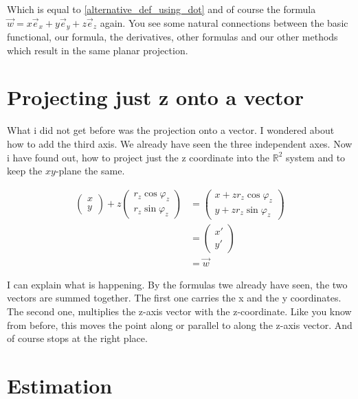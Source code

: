 \documentclass[a4paper]{article}
\begin{document}
Which is equal to \ref{alternative_def_using_dot} and of course the formula $\vec{w} = x\vec{e}_{x}+y\vec{e}_{y}+z\vec{e}_{z}$ again. You see some natural connections between the basic functional, our formula, the derivatives, other formulas and our other methods which result in the same planar projection.\\


\section{Projecting just z onto a vector}


\label{projecting_just_z}
What i did not get before was the projection onto a vector. I wondered about how to add the third axis. We already have seen the three independent axes. Now i have found out, how to project just the z coordinate into the $\mathbb{R}^{2}$ system and to keep the $xy$-plane the same. 

\begin{displaymath}
\begin{align}
\begin{pmatrix}x\\y\end{pmatrix} + z\begin{pmatrix}r_z\cos\varphi_z\\r_z\sin\varphi_z\end{pmatrix} &= \begin{pmatrix}x+zr_{z}\cos\varphi_z\\y+zr_{z}\sin\varphi_z\end{pmatrix}\\ &= \begin{pmatrix}x'\\y'\end{pmatrix}\\ &= \vec{w}
\end{align}
\end{displaymath}

I can explain what is happening. By the formulas twe already have seen, the two vectors are summed together. The first one carries the x and the y coordinates. The second one, multiplies the z-axis vector with the z-coordinate. Like you know from before, this moves the point along or parallel to along the z-axis vector. And of course stops at the right place.


\section{Estimation}
\end{document}
